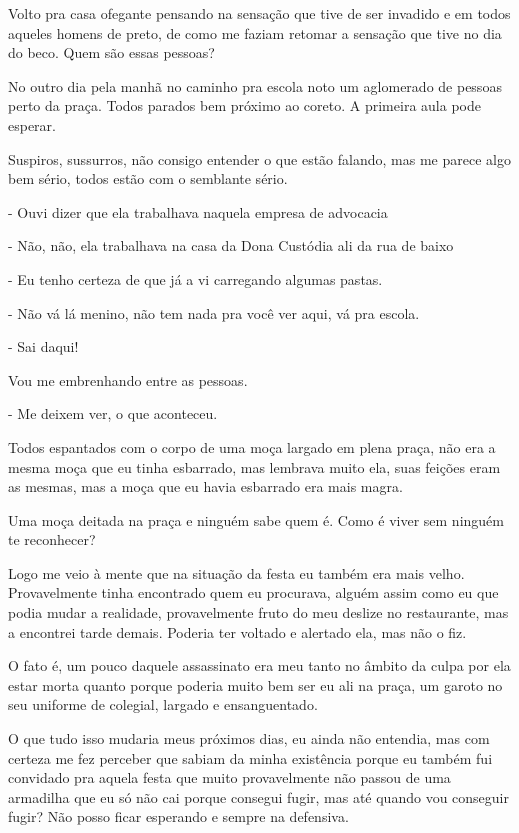 Volto pra casa ofegante pensando na sensação que tive de ser invadido e em todos aqueles homens de preto, de como me faziam retomar a sensação que tive no dia do beco. Quem são essas pessoas?

No outro dia pela manhã no caminho pra escola noto um aglomerado de pessoas perto da praça. Todos parados bem próximo ao coreto. A primeira aula pode esperar.

Suspiros, sussurros, não consigo entender o que estão falando, mas me parece algo bem sério, todos estão com o semblante sério.

- Ouvi dizer que ela trabalhava naquela empresa de advocacia

- Não, não, ela trabalhava na casa da Dona Custódia ali da rua de baixo

- Eu tenho certeza de que já a vi carregando algumas pastas.

- Não vá lá menino, não tem nada pra você ver aqui, vá pra escola. 

- Sai daqui!

Vou me embrenhando entre as pessoas.

- Me deixem ver, o que aconteceu.

Todos espantados com o corpo de uma moça largado em plena praça, não era a mesma moça que eu tinha esbarrado, mas lembrava muito ela, suas feições eram as mesmas, mas a moça que eu havia esbarrado era mais magra.

Uma moça deitada na praça e ninguém sabe quem é. Como é viver sem ninguém te reconhecer?

Logo me veio à mente que na situação da festa eu também era mais velho. Provavelmente tinha encontrado quem eu procurava, alguém assim como eu que podia mudar a realidade, provavelmente fruto do meu deslize no restaurante, mas a encontrei tarde demais. Poderia ter voltado e alertado ela, mas não o fiz.

O fato é, um pouco daquele assassinato era meu tanto no âmbito da culpa por ela estar morta quanto porque poderia muito bem ser eu ali na praça, um garoto no seu uniforme de colegial, largado e ensanguentado.

O que tudo isso mudaria meus próximos dias, eu ainda não entendia, mas com certeza me fez perceber que sabiam da minha existência porque eu também fui convidado pra aquela festa que muito provavelmente não passou de uma armadilha que eu só não cai porque consegui fugir, mas até quando vou conseguir fugir? Não posso ficar esperando e sempre na defensiva.


